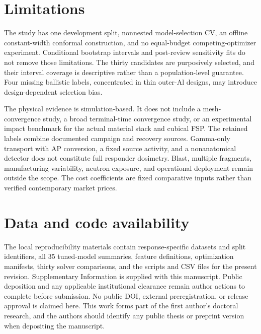\section*{Limitations}
The study has one development split, nonnested model-selection CV, an offline constant-width conformal construction, and no equal-budget competing-optimizer experiment. Conditional bootstrap intervals and post-review sensitivity fits do not remove those limitations. The thirty candidates are purposively selected, and their interval coverage is descriptive rather than a population-level guarantee. Four missing ballistic labels, concentrated in thin outer-Al designs, may introduce design-dependent selection bias.

The physical evidence is simulation-based. It does not include a mesh-convergence study, a broad terminal-time convergence study, or an experimental impact benchmark for the actual material stack and cubical FSP. The retained labels combine documented campaign and recovery sources. Gamma-only transport with AP conversion, a fixed source activity, and a nonanatomical detector does not constitute full responder dosimetry. Blast, multiple fragments, manufacturing variability, neutron exposure, and operational deployment remain outside the scope. The cost coefficients are fixed comparative inputs rather than verified contemporary market prices.

\section*{Data and code availability}
The local reproducibility materials contain response-specific datasets and split identifiers, all 35 tuned-model summaries, feature definitions, optimization manifests, thirty solver comparisons, and the scripts and CSV files for the present revision. Supplementary Information is supplied with this manuscript. Public deposition and any applicable institutional clearance remain author actions to complete before submission. No public DOI, external preregistration, or release approval is claimed here. This work forms part of the first author's doctoral research, and the authors should identify any public thesis or preprint version when depositing the manuscript.
